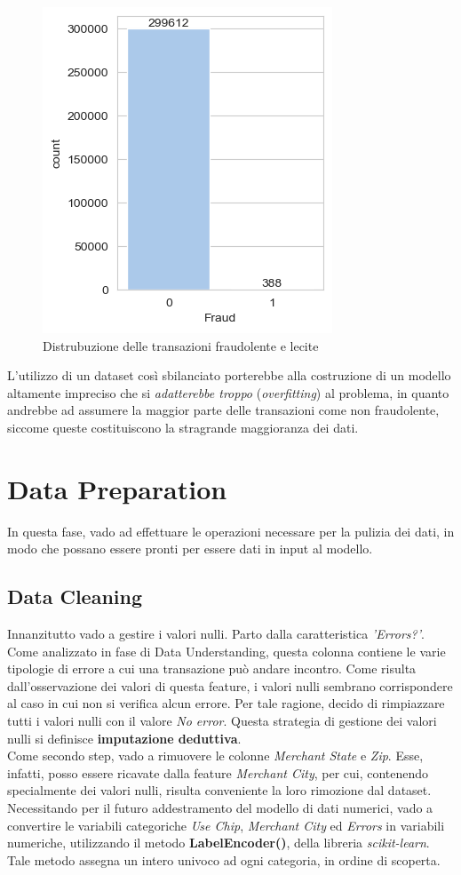 \documentclass[]{article}
\begin{document}
        \begin{figure}[H]
            \centering
            \includegraphics[width=.4\textwidth]{img/DistribuzioneFraudVsGen2.png}
            \caption[short]{Distrubuzione delle transazioni fraudolente e lecite}
        \end{figure}
        L’utilizzo di un dataset così sbilanciato porterebbe alla costruzione di un modello altamente impreciso che si \textit{adatterebbe troppo} (\textit{overfitting}) al problema, in quanto andrebbe ad assumere la maggior parte delle transazioni come non fraudolente, siccome queste costituiscono la stragrande maggioranza dei dati.

\section{Data Preparation}
    In questa fase, vado ad effettuare le operazioni necessare per la pulizia dei dati, in modo che possano essere pronti per essere dati in input al modello.
    \subsection{Data Cleaning}
        Innanzitutto vado a gestire i valori nulli. Parto dalla caratteristica \textit{'Errors?'}. Come analizzato in fase di Data Understanding, questa colonna contiene le varie tipologie di errore a cui una transazione può andare incontro.
        Come risulta dall'osservazione dei valori di questa feature, i valori nulli sembrano corrispondere al caso in cui non si verifica alcun errore. Per tale ragione, decido di rimpiazzare tutti i valori nulli con il valore \textit{No error}. Questa strategia di gestione dei valori nulli si definisce \textbf{imputazione deduttiva}.\\
        Come secondo step, vado a rimuovere le colonne \textit{Merchant State} e \textit{Zip}. Esse, infatti, posso essere ricavate dalla feature \textit{Merchant City}, per cui, contenendo specialmente dei valori nulli, risulta conveniente la loro rimozione dal dataset.\\
        Necessitando per il futuro addestramento del modello di dati numerici, vado a convertire le variabili categoriche \textit{Use Chip}, \textit{Merchant City} ed \textit{Errors} in variabili numeriche, utilizzando il metodo \textbf{LabelEncoder()}, della libreria \textit{scikit-learn}. Tale metodo assegna un intero univoco ad ogni categoria, in ordine di scoperta.
\end{document}
